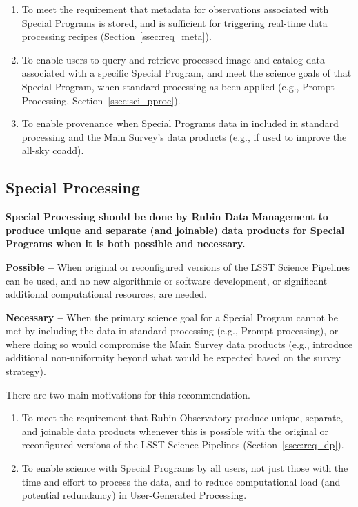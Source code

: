 \begin{enumerate}

\item To meet the requirement that metadata for observations associated 
with Special Programs is stored, and is sufficient for triggering 
real-time data processing recipes (Section~\ref{ssec:req_meta}).

\item To enable users to query and retrieve processed image and catalog
data associated with a specific Special Program, and meet the science goals
of that Special Program, when standard processing as been applied 
(e.g., Prompt Processing, Section~\ref{ssec:sci_pproc}).

\item To enable provenance when Special Programs data in included in standard
processing and the Main Survey's data products (e.g., if used to improve the
all-sky coadd).

\end{enumerate}

\subsection{Special Processing}\label{ssec:sci_sproc}

\textbf{Special Processing should be done by Rubin Data Management to 
produce unique and separate (and joinable) data products
for Special Programs when it is both possible and necessary.}

\textbf{Possible -- } When original or reconfigured versions of the LSST
Science Pipelines can be used, and no new algorithmic or software development,
or significant additional computational resources, are needed.

\textbf{Necessary -- } When the primary science goal for a Special Program 
cannot be met by including the data in standard processing (e.g., Prompt processing),
or where doing so would compromise the Main Survey data products (e.g., introduce additional non-uniformity beyond what would be expected based on the survey strategy).

There are two main motivations for this recommendation.

\begin{enumerate}

\item To meet the requirement that Rubin Observatory produce
unique, separate, and joinable data products whenever this is possible 
with the original or reconfigured versions of the LSST Science Pipelines
(Section~\ref{ssec:req_dp}).

\item To enable science with Special Programs by all users, not just those
with the time and effort to process the data, and to reduce computational
load (and potential redundancy) in User-Generated Processing.

\end{enumerate}

